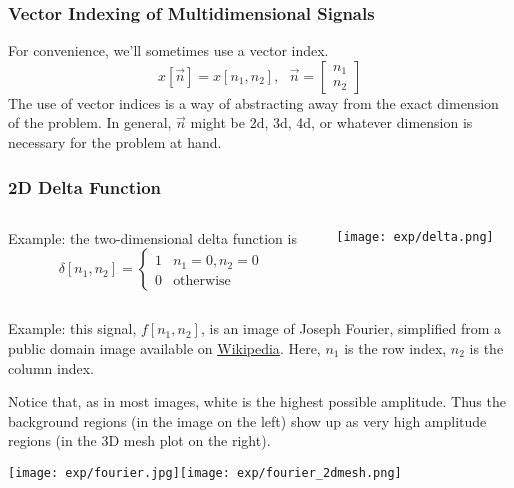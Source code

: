 \documentclass{beamer}
\begin{document}
\begin{frame}
  \frametitle{Vector Indexing of Multidimensional Signals}

  For convenience, we'll sometimes use a vector index.
  \[
  x[\vec{n}] = x[n_1,n_2],~~~\vec{n}=\left[\begin{array}{c}n_1\\n_2\end{array}\right]
  \]
  The use of vector indices is a way of abstracting away from the
  exact dimension of the problem.  In general, $\vec{n}$ might be 2d,
  3d, 4d, or whatever dimension is necessary for the problem at hand.
\end{frame}

\begin{frame}
  \frametitle{2D Delta Function}
  \begin{columns}
    \begin{column}{0.5\textwidth}
      \begin{block}{}
        Example: the two-dimensional delta function is
        \[
        \delta[n_1,n_2] = \begin{cases}
          1 & n_1=0,n_2=0\\
          0 & \mbox{otherwise}
        \end{cases}
        \]
      \end{block}
    \end{column}
    \begin{column}{0.5\textwidth}
      \begin{block}{}
        \begin{center}
          \texttt{[image: exp/delta.png]}
        \end{center}
      \end{block}
      \end{column}
  \end{columns}
\end{frame}

\begin{frame}
  Example: this signal, $f[n_1,n_2]$, is an image of Joseph Fourier,
  simplified from a public domain image available on
  \href{https://en.wikipedia.org/wiki/Joseph_Fourier}{\color{blue}Wikipedia}.
  Here, $n_1$ is the row index, $n_2$ is the column index.

  Notice that, as in most images, white is the highest possible
  amplitude.  Thus the background regions (in the image on the left)
  show up as very high amplitude regions (in the 3D mesh plot on the
  right).
  
  \centerline{\texttt{[image: exp/fourier.jpg]}\texttt{[image: exp/fourier\_2dmesh.png]}}
\end{frame}
\end{document}
